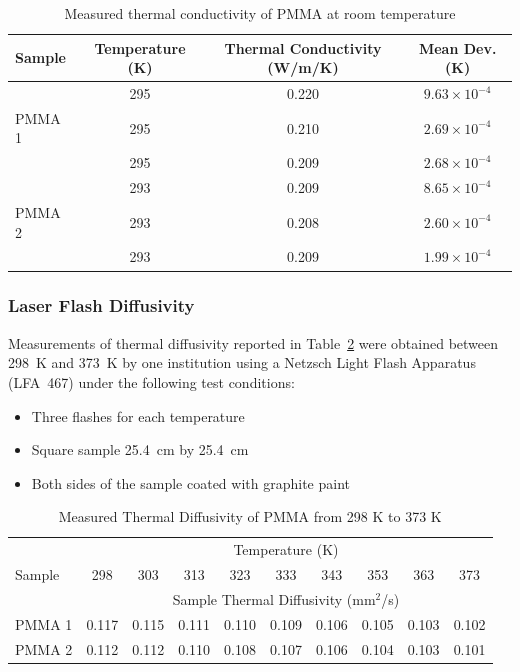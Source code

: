 \documentclass{book}
\begin{document}
\begin{table}[ht]
\caption{Measured thermal conductivity of PMMA at room temperature}
\label{Table_14}
\begin{center}
\begin{tabular}{|l|ccc|}
\hline
Sample    & Temperature (K) & Thermal Conductivity (W/m/K) & Mean Dev. (K)        \\ \hline
          & 295             & 0.220                        & $9.63\times10^{-4}$  \\
PMMA 1    & 295             & 0.210                        & $2.69\times10^{-4}$  \\
          & 295             & 0.209                        & $2.68\times10^{-4}$  \\ \hline & 293             & 0.209                        & $8.65\times10^{-4}$  \\
PMMA 2    & 293             & 0.208                        & $2.60\times10^{-4}$  \\
          & 293             & 0.209                        & $1.99\times10^{-4}$  \\ \hline
\end{tabular}
\end{center}
\end{table}


\subsubsection{Laser Flash Diffusivity}

Measurements of thermal diffusivity reported in Table~\ref{Table_15} were obtained between 298~K and 373~K by one institution using a Netzsch Light Flash Apparatus (LFA~467) under the following test conditions:
\begin{itemize}
 \item Three flashes for each temperature
 \item Square sample 25.4~cm by 25.4~cm
 \item Both sides of the sample coated with graphite paint
\end{itemize}

\begin{table}[ht]
\caption{Measured Thermal Diffusivity of PMMA from 298 K to 373 K}
\label{Table_15}
\begin{center}
\begin{tabular}{|l|ccccccccc|}
\hline
        & \multicolumn{9}{|c|}{Temperature (K)}                                 \\ \cline{2-10}
Sample  & 298  & 303  & 313  & 323  & 333  & 343  & 353  & 363  & 373           \\ \cline{2-10}
        & \multicolumn{9}{|c|}{Sample Thermal Diffusivity (mm$^2$/s)}           \\ \hline
PMMA 1  & 0.117 & 0.115 & 0.111 & 0.110 & 0.109 & 0.106 & 0.105 & 0.103 & 0.102 \\
PMMA 2  & 0.112 & 0.112 & 0.110 & 0.108 & 0.107 & 0.106 & 0.104 & 0.103 & 0.101 \\ \hline
\end{tabular}
\end{center}
\end{table}




\backmatter




\end{document}
